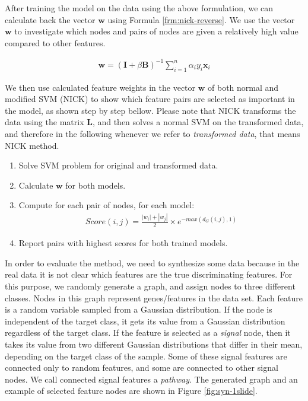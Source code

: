 After training the model on the data using the above formulation, we can calculate back the vector $\mathbf{w}$ using Formula \ref{frm:nick-reverse}. We use the vector $\mathbf{w}$ to investigate which nodes and pairs of nodes are given a relatively high value compared to other features.

\begin{align}
  \mathbf{w} = (\mathbf{I} + \beta \mathbf{B})^{-1} \sum_{i = 1}^n \alpha_i y_i \mathbf{x}_i
  \label{frm:nick-reverse}
\end{align}

We then use calculated feature weights in the vector $\mathbf{w}$ of both normal and modified SVM (NICK) to show which feature pairs are selected as important in the model, as shown step by step bellow. Please note that NICK transforms the data using the matrix $\mathbf{L}$, and then solves a normal SVM on the transformed data, and therefore in the following whenever we refer to \emph{transformed data}, that means NICK method.

\begin{enumerate}
\item Solve SVM problem for original and transformed data.
\item Calculate $\mathbf{w}$ for both models.
\item Compute for each pair of nodes, for each model: \\
  \begin{align}
    Score(i, j) = \frac{|w_i| + |w_j|}{2} \times e^{-max\left(d_G(i, j), 1\right)}
    \label{frm:nick-score}
  \end{align}
\item Report pairs with highest scores for both trained models.
\end{enumerate}

In order to evaluate the method, we need to synthesize some data because in the real data it is not clear which features are the true discriminating features. For this purpose, we randomly generate a graph, and assign nodes to three different classes. Nodes in this graph represent genes/features in the data set. Each feature is a random variable sampled from a Gaussian distribution. If the node is independent of the target class, it gets its value from a Gaussian distribution regardless of the target class. If the feature is selected as a \emph{signal} node, then it takes its value from two different Gaussian distributions that differ in their mean, depending on the target class of the sample. Some of these signal features are connected only to random features, and some are connected to other signal nodes. We call connected signal features a \emph{pathway}. The generated graph and an example of selected feature nodes are shown in Figure \ref{fig:syn-1slide}.

